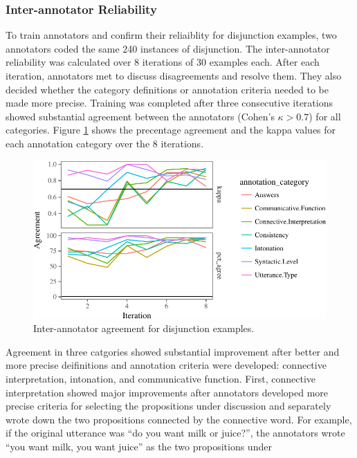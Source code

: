 \documentclass[oneside]{report}
\theoremstyle{definition}
\theoremstyle{definition}
\theoremstyle{definition}
\theoremstyle{remark}
\begin{document}
\subsubsection{Inter-annotator
Reliability}\label{inter-annotator-reliability}

To train annotators and confirm their reliaiblity for disjunction
examples, two annotators coded the same 240 instances of disjunction.
The inter-annotator reliability was calculated over 8 iterations of 30
examples each. After each iteration, annotators met to discuss
disagreements and resolve them. They also decided whether the category
definitions or annotation criteria needed to be made more precise.
Training was completed after three consecutive iterations showed
substantial agreement between the annotators (Cohen's \(\kappa > 0.7\))
for all categories. Figure \ref{fig:oReliabilityPlot} shows the
precentage agreement and the kappa values for each annotation category
over the 8 iterations.
\begin{figure}[tb]

{\centering \includegraphics{figs/oReliabilityPlot-1} 

}

\caption{Inter-annotator agreement for disjunction examples.}\label{fig:oReliabilityPlot}
\end{figure}
Agreement in three catgories showed substantial improvement after better
and more precise deifinitions and annotation criteria were developed:
connective interpretation, intonation, and communicative function.
First, connective interpretation showed major improvements after
annotators developed more precise criteria for selecting the
propositions under discussion and separately wrote down the two
propositions connected by the connective word. For example, if the
original utterance was ``do you want milk or juice?'', the annotators
wrote ``you want milk, you want juice'' as the two propositions under
\end{document}
